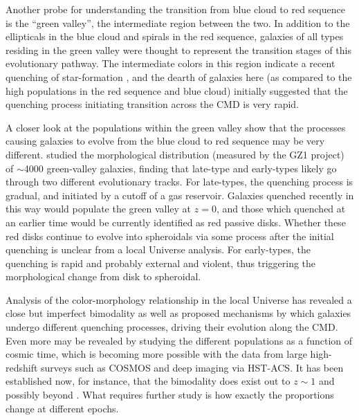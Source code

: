 Another probe for understanding the transition from blue cloud to red sequence is the ``green valley'', the intermediate region between the two. In addition to the ellipticals in the blue cloud and spirals in the red sequence, galaxies of all types residing in the green valley were thought to represent the transition stages of this evolutionary pathway. The intermediate colors in this region indicate a recent quenching of star-formation \citep{Martin2007,Salim2007}, and the dearth of galaxies here (as compared to the high populations in the red sequence and blue cloud) initially suggested that the quenching process initiating transition across the CMD is very rapid.

A closer look at the populations within the green valley show that the processes causing galaxies to evolve from the blue cloud to red sequence may be very different. \citet{Schawinski2009} studied the morphological distribution (measured by the GZ1 project) of $\sim$4000 green-valley galaxies, finding that late-type and early-types likely go through two different evolutionary tracks. For late-types, the quenching process is gradual, and initiated by a cutoff of a gas reservoir. Galaxies quenched recently in this way would populate the green valley at $z=0$, and those which quenched at an earlier time would be currently identified as red passive disks. Whether these red disks continue to evolve into spheroidals via some process after the initial quenching is unclear from a local Universe analysis. For early-types, the quenching is rapid and probably external and violent, thus triggering the morphological change from disk to spheroidal.  

Analysis of the color-morphology relationship in the local Universe has revealed a close but imperfect bimodality as well as proposed mechanisms by which galaxies undergo different quenching processes, driving their evolution along the CMD. Even more may be revealed by studying the different populations as a function of cosmic time, which is becoming more possible with the data from large high-redshift surveys such as COSMOS and deep imaging via HST-ACS. It has been established now, for instance, that the bimodality does exist out to $z\sim1$ \citep{Bell2004,Cirasuolo2007,Mignoli2009} and possibly beyond \citep{Giallongo2005,VanDokkum2006,Franzetti2007,Cassata2008}. What requires further study is how exactly the proportions change at different epochs.



